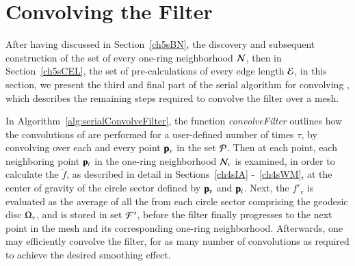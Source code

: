 %
%
%
%
\section{Convolving the Filter}
\label{ch5sCF}
After having discussed in Section~\ref{ch5sBN}, the discovery and subsequent construction of the set of every one-ring neighborhood $\mathcal{N}$, then in Section~\ref{ch5sCEL}, the set of pre-calculations of every edge length $\mathcal{E}$, in this section, we present the third and final part of the serial algorithm for convolving , which describes the remaining steps required to convolve the filter over a mesh.

In Algorithm~\ref{alg:serialConvolveFilter}, the function \textit{convolveFilter} outlines how the convolutions of  are performed for a user-defined number of times $\tau$, by convolving over each and every point $\mathbf{p}_v$ in the set $\mathcal{P}$. Then at each point, each neighboring point $\mathbf{p}_i$ in the one-ring neighborhood $\mathcal{N}_v$ is examined, in order to calculate the \wmfv{} $\check{f}$, as described in detail in Sections~\ref{ch4sIA} -~\ref{ch4sWM}, at the center of gravity of the circle sector defined by $\mathbf{p}_v$ and $\mathbf{p}_i$. Next, the \wmfv{} $f'_v$ is evaluated as the average of all the  from each circle sector comprising the geodesic disc $\Omega_v$, and is stored  in set $\mathcal{F}'$, before the filter finally progresses to the next point in the mesh and its corresponding one-ring neighborhood.  Afterwards, one may efficiently convolve the filter, for as many number of convolutions as required to achieve the desired smoothing effect.

